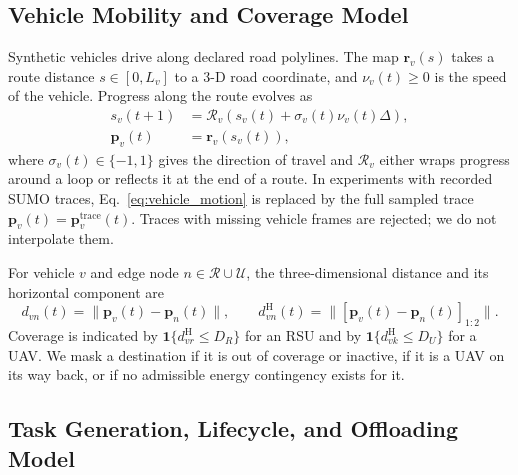 \subsection{Vehicle Mobility and Coverage Model}
Synthetic vehicles drive along declared road polylines. The map
$\boldsymbol r_v(s)$ takes a route distance $s\in[0,L_v]$ to a 3-D road
coordinate, and $\nu_v(t)\ge0$ is the speed of the vehicle. Progress along the
route evolves as
\begin{equation}
\begin{aligned}
s_v(t+1)&=\mathscr R_v\!\left(
s_v(t)+\sigma_v(t)\nu_v(t)\Delta\right),\\
\boldsymbol p_v(t)&=\boldsymbol r_v(s_v(t)),
\end{aligned}
\label{eq:vehicle_motion}
\end{equation}
where $\sigma_v(t)\in\{-1,1\}$ gives the direction of travel and
$\mathscr R_v$ either wraps progress around a loop or reflects it at the end
of a route. In experiments with recorded SUMO traces,
Eq.~\eqref{eq:vehicle_motion} is replaced by the full sampled trace
$\boldsymbol p_v(t)=\boldsymbol p_v^{\mathrm{trace}}(t)$. Traces with missing
vehicle frames are rejected; we do not interpolate them.

For vehicle $v$ and edge node $n\in\mathcal R\cup\mathcal U$, the
three-dimensional distance and its horizontal component are
\begin{equation}
d_{vn}(t)=\|\boldsymbol p_v(t)-\boldsymbol p_n(t)\|,\qquad
d_{vn}^{\mathrm H}(t)=
\|[\boldsymbol p_v(t)-\boldsymbol p_n(t)]_{1:2}\|.
\label{eq:distances}
\end{equation}
Coverage is indicated by
$\mathbf 1\{d_{vr}^{\mathrm H}\le D_R\}$ for an RSU and by
$\mathbf 1\{d_{vk}^{\mathrm H}\le D_U\}$ for a UAV. We mask a destination if
it is out of coverage or inactive, if it is a UAV on its way back, or if no
admissible energy contingency exists for it.

\subsection{Task Generation, Lifecycle, and Offloading Model}
\label{subsec:task_model}
